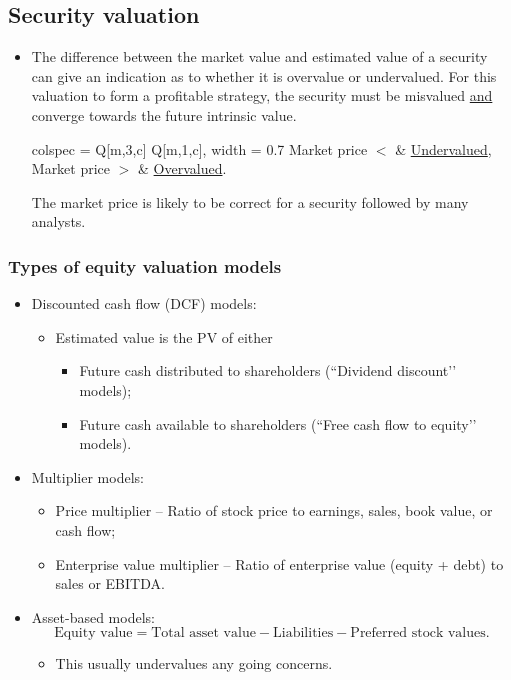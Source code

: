 \documentclass[../notes_compiled.tex]{subfiles}
\begin{document}
\subsection{Security valuation}
\begin{itemize}
\item The difference between the market value and estimated value of a security can give an indication as to whether it is overvalue or undervalued. For this valuation to form a profitable strategy, the security must be misvalued \underline{and} converge towards the future intrinsic value.
\begin{table}[H]
\centering
\begin{tblr}{colspec = {Q[m,3,c] Q[m,1,c]}, width = 0.7\textwidth}
Market price $<$  & \underline{Undervalued}, \\
Market price $>$  & \underline{Overvalued}.
\end{tblr}
\end{table}
The market price is likely to be correct for a security followed by many analysts.
\end{itemize}

\subsubsection{Types of equity valuation models}
\begin{itemize}
\item Discounted cash flow (DCF) models:
\begin{itemize}
\item Estimated value is the PV of either
\begin{itemize}
\item Future cash distributed to shareholders (``Dividend discount’’ models);
\item Future cash available to shareholders (``Free cash flow to equity’’ models).
\end{itemize}
\end{itemize}
\item Multiplier models:
\begin{itemize}
\item Price multiplier -- Ratio of stock price to earnings, sales, book value, or cash flow;
\item Enterprise value multiplier -- Ratio of enterprise value (equity + debt) to sales or EBITDA.
\end{itemize}
\item Asset-based models:
\begin{equation}
\text{Equity value} = \text{Total asset value} - \text{Liabilities} - \text{Preferred stock values}.
\end{equation}
\begin{itemize}
\item[] This usually undervalues any going concerns.
\end{itemize}
\end{itemize}
\end{document}
